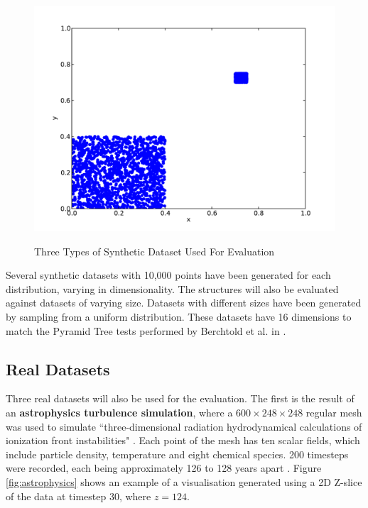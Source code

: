 \begin{figure}
\begin{center}
		\begin{subfloat} {%
			\includegraphics[scale=0.25]{figures/clustered_distribution.pdf}
		}
		\end{subfloat}
	\end{center}

	\caption{Three Types of Synthetic Dataset Used For Evaluation}
	\label{fig:synthetic-data}
\end{figure}

Several synthetic datasets with 10,000 points have been generated for each distribution, varying in dimensionality. The structures will also be evaluated against datasets of varying size. Datasets with different sizes have been generated by sampling from a uniform distribution. These datasets have 16 dimensions to match the Pyramid Tree tests performed by Berchtold et al. in \cite{pyramid-tree}.

\subsection{Real Datasets}

Three real datasets will also be used for the evaluation. The first is the result of an \textbf{astrophysics turbulence simulation}, where a $600 \times 248 \times 248$ regular mesh was used to simulate ``three-dimensional radiation hydrodynamical calculations of ionization front instabilities" \cite{astrophysics-dataset}.  Each point of the mesh has ten scalar fields, which include particle density, temperature and eight chemical species. 200 timesteps were recorded, each being approximately 126 to 128 years apart \cite{astrophysics-dataset}. Figure \ref{fig:astrophysics} shows an example of a visualisation generated using a 2D Z-slice of the data at timestep 30, where $z = 124$.

